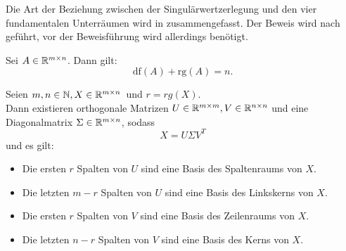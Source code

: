 Die Art der Beziehung zwischen der Singulärwertzerlegung und den vier fundamentalen Unterräumen wird in  zusammengefasst.
Der Beweis wird nach~\cite[S. 214~f.]{johnstonAdvancedLinearMatrix2021} geführt, vor der Beweisführung wird allerdings  benötigt.
\begin{repitition}[Dimensionssatz]\label{rep:dim}
    Sei \(A \in \mathbb{R}^{m \times n}\). Dann gilt:
    \begin{equation*}
        \text{df}(A) + \text{rg}(A) = n.
    \end{equation*} 
\end{repitition}
\begin{corollary}\label{cor:svd}
    Seien \(m,n\in\mathbb{N}, X \in \mathbb{R}^{m \times n}\)\ und \(r = \textit{rg}(X)\).  \\
    Dann existieren orthogonale Matrizen \(U \in \mathbb{R}^{m \times m}, V \in \mathbb{R}^{n \times n}\) und eine Diagonalmatrix \(\Sigma \in \mathbb{R}^{m \times n}\), sodass
    \begin{equation*}
        X = U \Sigma V^{T}
    \end{equation*}   
    und es gilt:
    \begin{itemize}
        \item Die ersten \(r\) Spalten von \(U\) sind eine Basis des Spaltenraums von \(X\).
        \item Die letzten \(m-r\) Spalten von \(U\) sind eine Basis des Linkskerns von \(X\).
        \item Die ersten \(r\) Spalten von \(V\) sind eine Basis des Zeilenraums von \(X\).
        \item Die letzten \(n - r\) Spalten von \(V\) sind eine Basis des Kerns von \(X\).          
    \end{itemize}
\end{corollary}

